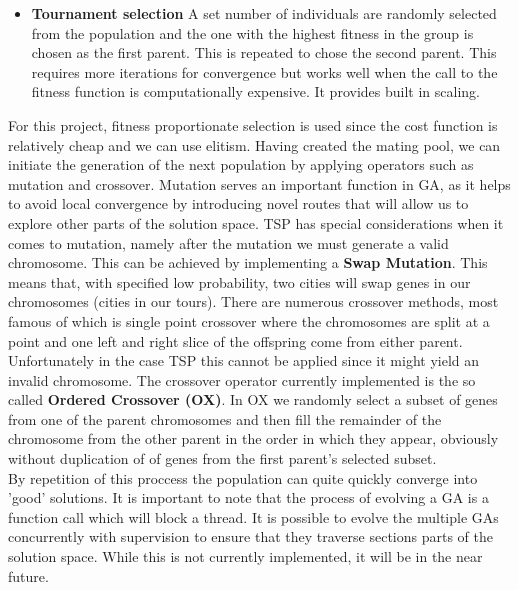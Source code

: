 \documentclass[11pt]{article}
\begin{document}
\begin{itemize}
\begin{itemize}
\item \textbf{Tournament selection} A set number of individuals are randomly selected from the population and the one with the highest fitness in the group is chosen as the first parent. This is repeated to chose the second parent. This requires more iterations for convergence but works well when the call to the fitness function is computationally expensive. It provides built in scaling.
\end{itemize}
For this project, fitness proportionate selection is used since the cost function is relatively cheap and we can use elitism. Having created the mating pool, we can initiate the generation of the next population by applying operators such as mutation and crossover. Mutation serves an important function in GA, as it helps to avoid local convergence by introducing novel routes that will allow us to explore other parts of the solution space. TSP has special considerations when it comes to mutation, namely after the mutation we must generate a valid chromosome. This can be achieved by implementing a \textbf{Swap Mutation}. This means that, with specified low probability, two cities will swap genes in our chromosomes (cities in our tours). There are numerous crossover methods, most famous of which is single point crossover where the chromosomes are split at a point and one left and right slice of the offspring come from either parent. Unfortunately in the case TSP this cannot be applied since it might yield an invalid chromosome. The crossover operator currently implemented is the so called \textbf{Ordered Crossover (OX)}. In OX we randomly select a subset of genes from one of the parent chromosomes and then fill the remainder of the chromosome from the other parent in the order in which they appear, obviously without duplication of of genes from the first parent's selected subset. \\
By repetition of this proccess the population can quite quickly converge into 'good' solutions. It is important to note that the process of evolving a GA is a function call which will block a thread. It is possible to evolve the multiple GAs concurrently with supervision to ensure that they traverse sections parts of the solution space. While this is not currently implemented, it will be in the near future.
\end{itemize}
\end{document}
